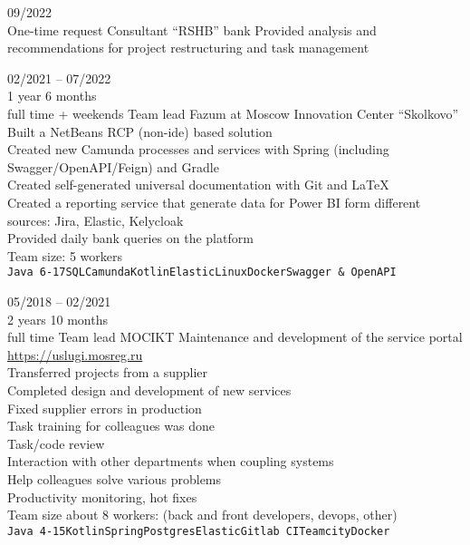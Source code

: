


\begin{entrylist}
    \entry
    {09/2022\\\footnotesize{One-time request}}
    {Consultant}
    {\enquote{RSHB} bank}
    {
        Provided analysis and recommendations for project restructuring and task management
    }

    \entry
    {02/2021 -- 07/2022\\\footnotesize{1 year 6 months\\full time + weekends}}
    {Team lead}
    {Fazum at Moscow Innovation Center \enquote{Skolkovo}}
    {
        Built a NetBeans RCP (non-ide) based solution \\
    Created new Camunda processes and services with Spring (including Swagger/OpenAPI/Feign) and Gradle \\
    Created self-generated universal documentation with Git and LaTeX \\
    Created a reporting service that generate data for Power BI form different sources: Jira, Elastic, Kelycloak \\
    Provided daily bank queries on the platform \\
    Team size: 5 workers\\
    \texttt{Java 6-17}\slashsep\texttt{SQL}\slashsep\texttt{Camunda}\slashsep\texttt{Kotlin}\slashsep\texttt{Elastic}\slashsep\texttt{Linux}\slashsep\texttt{Docker}\slashsep\texttt{Swagger \& OpenAPI}
    }

    \entry
    {05/2018 -- 02/2021\\\footnotesize{2 years 10 months\\full time}}
    {Team lead}
    {MOCIKT}
    {
        Maintenance and development of the service portal \url{https://uslugi.mosreg.ru} \\
        Transferred projects from a supplier \\
        Completed design and development of new services \\
        Fixed supplier errors in production \\
        Task training for colleagues was done \\
        Task/code review \\
        Interaction with other departments when coupling systems \\
        Help colleagues solve various problems \\
        Productivity monitoring, hot fixes \\
    Team size about 8 workers: (back and front developers, devops, other) \\
    \texttt{Java 4-15}\slashsep\texttt{Kotlin}\slashsep\texttt{Spring}\slashsep\texttt{Postgres}\slashsep\texttt{Elastic}\slashsep\texttt{Gitlab CI}\slashsep\texttt{Teamcity}\slashsep\texttt{Docker}
	}


\end{entrylist}

